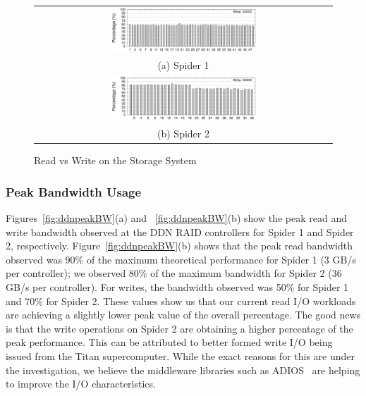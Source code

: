 \begin{figure}[!t]
\begin{center}
\begin{tabular}{c}
{\includegraphics[width=0.5\textwidth]{./figs/spider1-wr-ratio.eps}}\\
{(a) Spider 1}\\
{\includegraphics[width=0.5\textwidth]{./figs/spider2-wr-ratio.eps}}\\
{(b) Spider 2}\\
\end{tabular}
\vspace{-0.1in}
\caption{Read vs Write on the Storage System}
\label{fig:rwratio}
\end{center}
\end{figure}

\subsubsection{Peak Bandwidth Usage}

Figures~\ref{fig:ddnpeakBW}(a) and ~\ref{fig:ddnpeakBW}(b) show the
peak read and write bandwidth observed at the DDN RAID controllers for Spider 1
and Spider 2, respectively.  Figure~\ref{fig:ddnpeakBW}(b) shows that the peak read
bandwidth observed was 90\% of the 
maximum theoretical performance for Spider 1 (3 GB/s per controller); we observed 80\% of the maximum bandwidth for 
Spider 2 (36 GB/s per controller). For writes, the bandwidth observed was 50\% for Spider 1 and 70\% for
Spider 2. These values show us that our current read I/O workloads are achieving a 
slightly lower peak value of the overall percentage. The good news is that the write
operations on Spider 2 are obtaining a higher percentage of the peak performance.
This can be
attributed to better formed write I/O being issued from the Titan supercomputer. While 
the exact reasons for this are under the investigation, we believe the middleware 
libraries such as ADIOS~\cite{adios} are helping to improve the I/O characteristics. 


